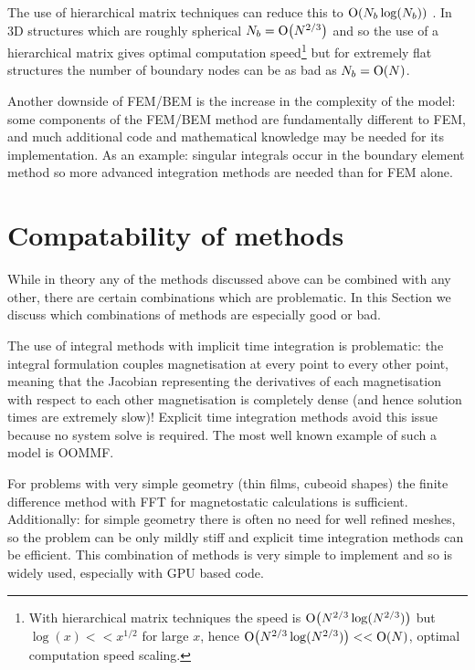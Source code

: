 The use of hierarchical matrix techniques can reduce this to $\text{O}{\left( N_b \log(N_b) \right)}$ \cite{Knittel2009}.
In 3D structures which are roughly spherical $N_b = \text{O}{\left( N^{2/3} \right)}$ and so the use of a hierarchical matrix gives optimal computation speed\footnote{With hierarchical matrix techniques the speed is $\text{O}{\left( N^{2/3}\log(N^{2/3}) \right)}$ but $\log(x) << x^{1/2}$ for large $x$, hence $\text{O}{\left( N^{2/3}\log(N^{2/3}) \right)} << \text{O}{\left( N \right)}$, \ie optimal computation speed scaling.} but for extremely flat structures the number of boundary nodes can be as bad as $N_b = \text{O}{\left( N \right)}$.

Another downside of FEM/BEM is the increase in the complexity of the model: some components of the FEM/BEM method are fundamentally different to FEM, and much additional code and mathematical knowledge may be needed for its implementation.
As an example: singular integrals occur in the boundary element method so more advanced integration methods are needed than for FEM alone.



\section{Compatability of methods}
\label{sec:comp-meth}

While in theory any of the methods discussed above can be combined with any other, there are certain combinations which are problematic.
In this Section we discuss which combinations of methods are especially good or bad.

The use of integral methods with implicit time integration is problematic: the integral formulation couples magnetisation at every point to every other point, meaning that the Jacobian representing the derivatives of each magnetisation with respect to each other magnetisation is completely dense (and hence solution times are extremely slow)!
Explicit time integration methods avoid this issue because no system solve is required.
The most well known example of such a model is OOMMF.


For problems with very simple geometry (\ie thin films, cubeoid shapes) the finite difference method with FFT for magnetostatic calculations is sufficient.
Additionally: for simple geometry there is often no need for well refined meshes, so the problem can be only mildly stiff and explicit time integration methods can be efficient.
This combination of methods is very simple to implement and so is widely used, especially with GPU based code.

